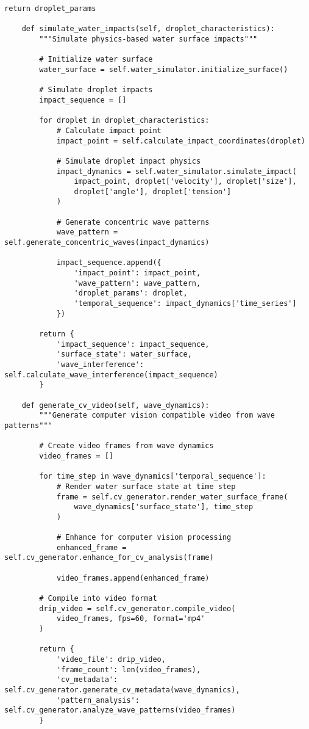 \documentclass[12pt,a4paper]{article}
\begin{document}
\begin{lstlisting}[style=pythonstyle, caption=Core Audio-to-Drip Implementation]
        return droplet_params
    
    def simulate_water_impacts(self, droplet_characteristics):
        """Simulate physics-based water surface impacts"""
        
        # Initialize water surface
        water_surface = self.water_simulator.initialize_surface()
        
        # Simulate droplet impacts
        impact_sequence = []
        
        for droplet in droplet_characteristics:
            # Calculate impact point
            impact_point = self.calculate_impact_coordinates(droplet)
            
            # Simulate droplet impact physics
            impact_dynamics = self.water_simulator.simulate_impact(
                impact_point, droplet['velocity'], droplet['size'], 
                droplet['angle'], droplet['tension']
            )
            
            # Generate concentric wave patterns
            wave_pattern = self.generate_concentric_waves(impact_dynamics)
            
            impact_sequence.append({
                'impact_point': impact_point,
                'wave_pattern': wave_pattern,
                'droplet_params': droplet,
                'temporal_sequence': impact_dynamics['time_series']
            })
        
        return {
            'impact_sequence': impact_sequence,
            'surface_state': water_surface,
            'wave_interference': self.calculate_wave_interference(impact_sequence)
        }
    
    def generate_cv_video(self, wave_dynamics):
        """Generate computer vision compatible video from wave patterns"""
        
        # Create video frames from wave dynamics
        video_frames = []
        
        for time_step in wave_dynamics['temporal_sequence']:
            # Render water surface state at time step
            frame = self.cv_generator.render_water_surface_frame(
                wave_dynamics['surface_state'], time_step
            )
            
            # Enhance for computer vision processing
            enhanced_frame = self.cv_generator.enhance_for_cv_analysis(frame)
            
            video_frames.append(enhanced_frame)
        
        # Compile into video format
        drip_video = self.cv_generator.compile_video(
            video_frames, fps=60, format='mp4'
        )
        
        return {
            'video_file': drip_video,
            'frame_count': len(video_frames),
            'cv_metadata': self.cv_generator.generate_cv_metadata(wave_dynamics),
            'pattern_analysis': self.cv_generator.analyze_wave_patterns(video_frames)
        }
\end{lstlisting}
\end{document}
